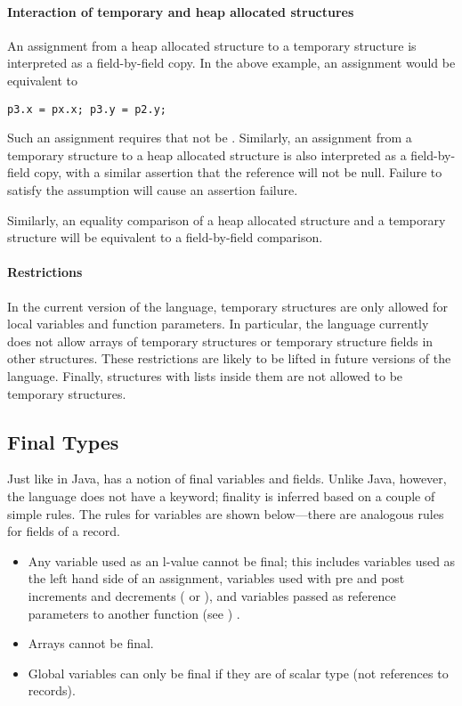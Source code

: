 \paragraph{Interaction of temporary and heap allocated structures}
An assignment from a heap allocated structure to a temporary structure is interpreted as a field-by-field copy. In the above example, an assignment  would be equivalent to 
\begin{lstlisting}
p3.x = px.x; p3.y = p2.y;
\end{lstlisting}
Such an assignment requires that  not be . Similarly, an assignment from a temporary structure to a heap allocated structure is also interpreted as a field-by-field copy, with a similar assertion that the reference will not be null. Failure to satisfy the assumption will cause an assertion failure. 

Similarly, an equality comparison of a heap allocated structure and a temporary structure will be equivalent to a field-by-field comparison.

\paragraph{Restrictions}
In the current version of the language, temporary structures are only allowed for local variables and function parameters. In particular, the language currently does not allow arrays of temporary structures or temporary structure fields in other structures. These restrictions are likely to be lifted in future versions of the language. Finally, structures with lists inside them are not allowed to be temporary structures.




\subsection{Final Types}
Just like in Java, \Sk{} has a notion of final variables and fields. Unlike Java, however, the language does not have a  keyword; finality is inferred based on a couple of simple rules. The rules for variables are shown below---there are analogous rules for fields of a record. 

\begin{itemize}
\item Any variable used as an l-value cannot be final; this includes variables used as the left hand side of an assignment, variables used with pre and post increments and decrements ( or ), and variables passed as reference parameters to another function (see ) .
\item Arrays cannot be final. 
\item Global variables can only be final if they are of scalar type (not references to records).
\end{itemize}

